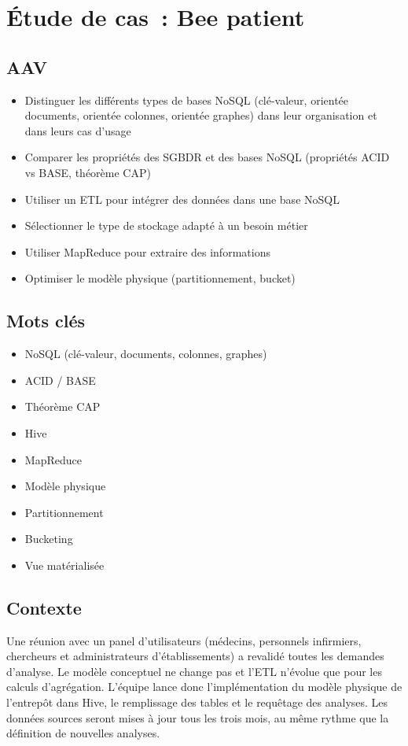 \newpage
\section*{Étude de cas~: Bee patient}
{}

\subsection*{AAV}
{}
\begin{itemize}
	\item [2] Distinguer les différents types de bases NoSQL (clé-valeur, orientée documents, orientée colonnes, orientée graphes) dans leur organisation et dans leurs cas d'usage
	\item [2] Comparer les propriétés des SGBDR et des bases NoSQL (propriétés ACID vs BASE, théorème CAP)
	\item [3] Utiliser un ETL pour intégrer des données dans une base NoSQL
	\item [4] Sélectionner le type de stockage adapté à un besoin métier
	\item [3] Utiliser MapReduce pour extraire des informations
	\item [4] Optimiser le modèle physique (partitionnement, bucket)
\end{itemize}

\subsection*{Mots clés}
{}
\begin{itemize}
	\item NoSQL (clé-valeur, documents, colonnes, graphes)
	\item ACID / BASE
	\item Théorème CAP
	\item Hive
	\item MapReduce
	\item Modèle physique
	\item Partitionnement
	\item Bucketing
	\item Vue matérialisée
\end{itemize}

\subsection*{Contexte}
{}
\noindent Une réunion avec un panel d'utilisateurs (médecins, personnels infirmiers, chercheurs et administrateurs d'établissements) a revalidé toutes les demandes d'analyse. Le modèle conceptuel ne change pas et l'ETL n'évolue que pour les calculs d'agrégation. L'équipe lance donc l'implémentation du modèle physique de l'entrepôt dans Hive, le remplissage des tables et le requêtage des analyses. Les données sources seront mises à jour tous les trois mois, au même rythme que la définition de nouvelles analyses.

